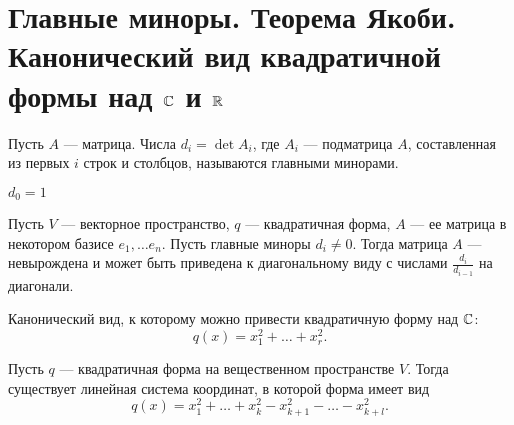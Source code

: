 \section{Главные миноры. Теорема Якоби. Канонический вид квадратичной формы над $ \mathbb{C}$ и $ \mathbb{R}$}
\begin{defn}
    Пусть $ A$ --- матрица. Числа  $ d_i = \det A_i$, где $ A_i$ --- подматрица  $ A$, составленная из первых  $ i$ строк и столбцов, называются {\sf главными минорами}. 
    \begin{note}
        $ d_0= 1$
    \end{note}
\end{defn}
\begin{thm}[Якоби]
    Пусть $ V$ ---  векторное пространство, $ q $ --- квадратичная форма,  $ A$ --- ее матрица в некотором базисе  $ e_1, \ldots e_n$. Пусть главные миноры $ d_i \ne 0$. Тогда матрица $ A$ --- невырождена и может быть приведена к диагональному виду с числами  $ \frac{d_i}{d_{i-1}}$ на диагонали.
\end{thm}
\begin{st}
    Канонический вид, к которому можно привести квадратичную форму над $ \mathbb{C}$:
     \[
	 q(x) = x_1^2+ \ldots + x^{2}_r
    .\] 
\end{st}
\begin{st}
    Пусть $ q$ --- квадратичная форма на вещественном пространстве $ V$. Тогда  существует линейная система координат, в которой форма имеет вид
    \[
	q(x) = x_1^2+ \ldots + x_k^2 - x_{k+1}^2 - \ldots - x_{k+l}^2
    .\] 
\end{st}
